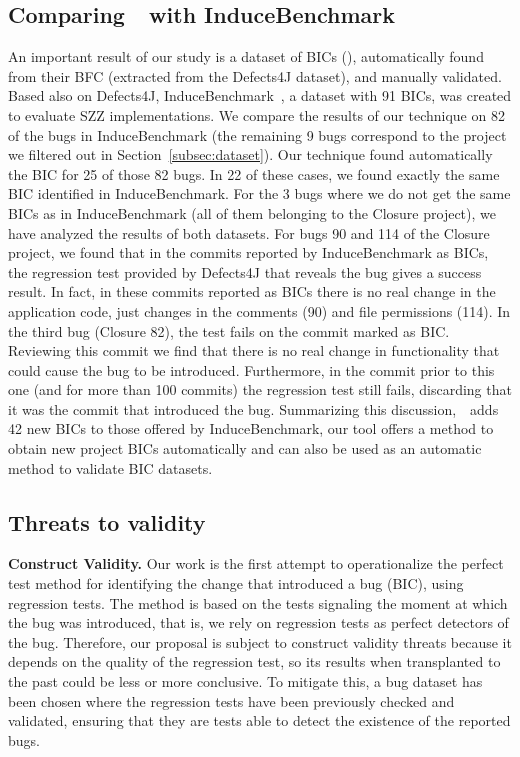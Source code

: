 \subsection{Comparing~\datasetName~with InduceBenchmark}
\label{sec:induce-benchmark}
An important result of our study is a dataset of BICs (\datasetName), automatically found from their BFC (extracted from the Defects4J dataset), and manually validated. 
Based also on Defects4J, InduceBenchmark~\cite{wen2019exploring}, a dataset with 91 BICs, was created to evaluate SZZ implementations. 
We compare the results of our technique on 82 of the bugs in InduceBenchmark (the remaining 9 bugs correspond to the project we filtered out in Section~\ref{subsec:dataset}). 
Our technique found automatically the BIC for 25 of those 82 bugs. In 22 of these cases, we found exactly the same BIC identified in InduceBenchmark.
For the 3 bugs where we do not get the same BICs as in InduceBenchmark (all of them belonging to the Closure project), we have analyzed the results of both datasets.
For bugs 90 and 114 of the Closure project, we found that in the commits reported by InduceBenchmark as BICs, the regression test provided by Defects4J that reveals the bug gives a success result. In fact, in these commits reported as BICs there is no real change in the application code, just changes in the comments (90) and file permissions (114).
In the third bug (Closure 82), the test fails on the commit marked as BIC. Reviewing this commit we find that there is no real change in functionality that could cause the bug to be introduced. Furthermore, in the commit prior to this one (and for more than 100 commits) the regression test still fails, discarding that it was the commit that introduced the bug. 
Summarizing this discussion,~\datasetName~adds 42 new BICs to those offered by InduceBenchmark, our tool offers a method to obtain new project BICs automatically and can also be used as an automatic method to validate BIC datasets.

\newpage

\subsection{Threats to validity}
\label{sec:threats}

\textbf{Construct Validity.}
Our work is the first attempt to operationalize the perfect test method for identifying the change that introduced a bug (BIC), using regression tests. 
The method is based on the tests signaling the moment at which the bug was introduced, that is, we rely on regression tests as perfect detectors of the bug. 
Therefore, our proposal is subject to construct validity threats because it depends on the quality of the regression test, so its results when transplanted to the past could be less or more conclusive. 
To mitigate this, a bug dataset has been chosen where the regression tests have been previously checked and validated, ensuring that they are tests able to detect the existence of the reported bugs.

